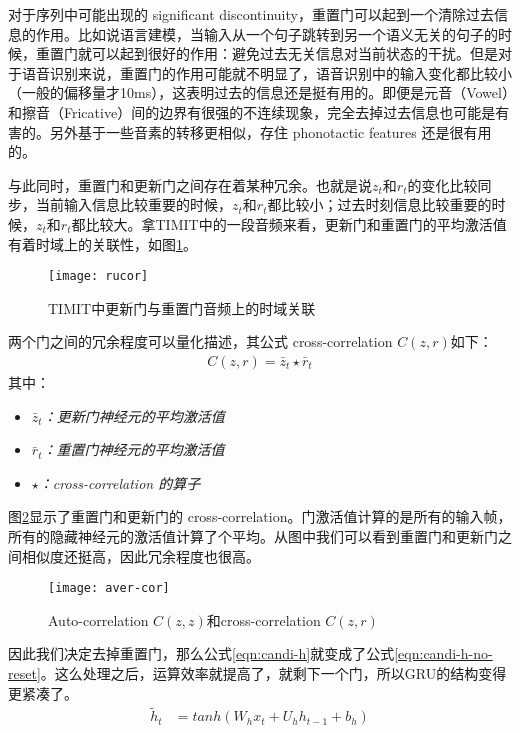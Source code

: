 对于序列中可能出现的 significant discontinuity，重置门可以起到一个清除过去信息的作用。比如说语言建模，当输入从一个句子跳转到另一个语义无关的句子的时候，重置门就可以起到很好的作用：避免过去无关信息对当前状态的干扰。但是对于语音识别来说，重置门的作用可能就不明显了，语音识别中的输入变化都比较小（一般的偏移量才10ms），这表明过去的信息还是挺有用的。即便是元音（Vowel）和擦音（Fricative）间的边界有很强的不连续现象，完全去掉过去信息也可能是有害的。另外基于一些音素的转移更相似，存住 phonotactic features 还是很有用的。

与此同时，重置门和更新门之间存在着某种冗余。也就是说$z_t$和$r_t$的变化比较同步，当前输入信息比较重要的时候，$z_t$和$r_t$都比较小；过去时刻信息比较重要的时候，$z_t$和$r_t$都比较大。拿TIMIT中的一段音频来看，更新门和重置门的平均激活值有着时域上的关联性，如图\ref{fig:ru-correlation}。
\begin{figure}[htbp]
  \centering
  \texttt{[image: rucor]}
  \caption{TIMIT中更新门与重置门音频上的时域关联 \label{fig:ru-correlation}}
\end{figure}

两个门之间的冗余程度可以量化描述，其公式 cross-correlation $C(z,r)$如下：
\begin{align}
\label{eqn:rucor}
C(z,r) = \bar{z}_t \star \bar{r}_t
\end{align}
其中：
\begin{itemize}
  \item \textit{$\bar{z}_t$：更新门神经元的平均激活值}
  \item \textit{$\bar{r}_t$：重置门神经元的平均激活值}
  \item \textit{$\star$：cross-correlation 的算子} 
\end{itemize}

图\ref{fig:aver-cor}显示了重置门和更新门的 cross-correlation。门激活值计算的是所有的输入帧，所有的隐藏神经元的激活值计算了个平均。从图中我们可以看到重置门和更新门之间相似度还挺高，因此冗余程度也很高。
\begin{figure}[htbp]
  \centering
  \texttt{[image: aver-cor]}
  \caption{Auto-correlation $C(z,z)$和cross-correlation $C(z,r)$ \label{fig:aver-cor}}
\end{figure}

因此我们决定去掉重置门，那么公式\ref{eqn:candi-h}就变成了公式\ref{eqn:candi-h-no-reset}。这么处理之后，运算效率就提高了，就剩下一个门，所以GRU的结构变得更紧凑了。
\begin{align}
\label{eqn:candi-h-no-reset}
\tilde{h}_{t} &= tanh(W_{h}x_{t}+U_{h}h_{t-1}+b_{h})
\end{align}

